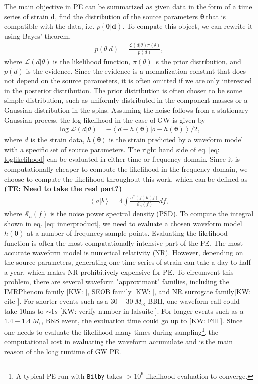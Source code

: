 \documentclass[twocolumn]{aastex631}
\newcommand{\kw}[1]{{\color{rb4}[KW: #1 ]}}
\newcommand{\te}[1]{\textbf{\color{pyRed}(TE: #1)}}
\begin{document}
The main objective in PE can be summarized as given data in the form of a time
series of strain $\mathbf{d}$, find the distribution of the source parameters
$\mathbf{\theta}$ that is compatible with the data, i.e.
$p(\mathbf{\theta}|\mathbf{d})$. To compute this object, we can rewrite
it using Bayes' theorem,
\begin{align}
    p(\theta| d) = \frac{\mathcal{L}(d|\theta)\pi(\theta)}{p(d)},
\end{align}
where $\mathcal{L}(d|\theta)$ is the likelihood function, $\pi(\theta)$ is the
prior distribution, and $p(d)$ is the evidence. Since the evidence is a
normalization constant that does not depend on the source parameters, it is
often omitted if we are only interested in the posterior distribution. The prior
distribution is often chosen to be some simple distribution, such as uniformly
distributed in the component masses or a Gaussian distribution in the spins.
Assuming the noise follows from a stationary Gaussian process, the
log-likelihood in the case of GW is given by
\begin{align}
    \log{\mathcal{L}(d|\theta)} = -\left<d-h(\mathbf{\theta})|d-h(\mathbf{\theta})\right>/2,
\label{eq: loglikelihood}
\end{align}
where $d$ is the strain data, $h(\mathbf{\theta})$ is the strain predicted by a
waveform model with a specific set of source parameters. The right hand side of
eq. \ref{eq: loglikelihood} can be evaluated in either time or frequency domain.
Since it is computationally cheaper to compute the likelihood in the frequency
domain, we choose to compute the likelihood throughout this work, which can be defined as 
\te{Need to take the real part?}
\begin{align}
    \left<a|b\right> = 4 \int \frac{a^*(f)b(f)}{\mathcal{S}_n(f)} df,
\label{eq: innerproduct}
\end{align}
where $\mathcal{S}_n(f)$ is the noise power spectral density (PSD). To compute
the integral shown in eq. \ref{eq: innerproduct}, we need to evaluate a chosen
waveform model $h(\mathbf{\theta})$ at a number of frequnecy sample points.
Evaluating the likelihood function is often the most computationally intensive
part of the PE. The most accurate waveform model is numerical relativity (NR).
However, depending on the source parameters, generating one time series of
strain can take a day to half a year, which makes NR prohibitively
expensive for PE. To circumvent this problem, there are several waveform
"approximant" families, including the IMRPhenom family \kw{}, SEOB family \kw{},
and NR surrogate family\kw{cite}. For shorter events such as a $30-30\ M_{\odot}$
BBH, one waveform call could take $10\text{ms}$ to $\sim 1s$ \kw{verify number
in lalsuite}. For longer events such as a $1.4-1.4\ M_{\odot}$ BNS event, the
evaluation time could go up to \kw{Fill}. Since one needs to evaluate the
likelihood many times during sampling\footnote{A typical PE run with
\texttt{Bilby} takes $>10^6$ likelihood evaluation to converge.}, the
computational cost in evaluating the waveform accumulate and is the main reason
of the long runtime of GW PE.
\end{document}
